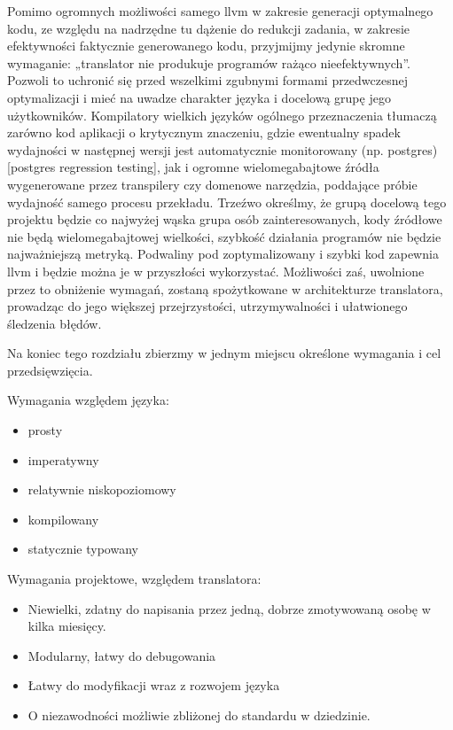 Pomimo ogromnych możliwości samego llvm w zakresie generacji optymalnego kodu, ze względu na nadrzędne tu dążenie do redukcji zadania, w zakresie efektywności faktycznie generowanego kodu, przyjmijmy jedynie skromne wymaganie: „translator nie produkuje programów rażąco nieefektywnych”. Pozwoli to uchronić się przed wszelkimi zgubnymi formami przedwczesnej optymalizacji i mieć na uwadze charakter języka i docelową grupę jego użytkowników. Kompilatory wielkich języków ogólnego przeznaczenia tłumaczą zarówno kod aplikacji o krytycznym znaczeniu, gdzie ewentualny spadek wydajności w następnej wersji jest automatycznie monitorowany (np. postgres)[postgres regression testing], jak i ogromne wielomegabajtowe źródła  wygenerowane przez transpilery czy domenowe narzędzia, poddające próbie wydajność samego procesu przekładu.
Trzeźwo określmy, że grupą docelową tego projektu będzie co najwyżej wąska grupa osób zainteresowanych, kody źródłowe nie będą wielomegabajtowej wielkości, szybkość działania programów nie będzie najważniejszą metryką. Podwaliny pod zoptymalizowany i szybki kod zapewnia llvm i będzie można je w przyszłości wykorzystać. Możliwości zaś, uwolnione przez to obniżenie wymagań, zostaną spożytkowane w architekturze translatora, prowadząc do jego większej przejrzystości, utrzymywalności i ułatwionego śledzenia błędów.

Na koniec tego rozdziału zbierzmy w jednym miejscu określone wymagania i cel przedsięwzięcia.

Wymagania względem języka:
\begin{itemize}[noitemsep]
    \item prosty
    \item imperatywny
    \item relatywnie niskopoziomowy
    \item kompilowany
    \item statycznie typowany
\end{itemize}

Wymagania projektowe, względem translatora:
\begin{itemize}[noitemsep]
    \item Niewielki, zdatny do napisania przez jedną, dobrze zmotywowaną osobę w kilka miesięcy.
    \item Modularny, łatwy do debugowania
    \item Łatwy do modyfikacji wraz z rozwojem języka
    \item O niezawodności możliwie zbliżonej do standardu w dziedzinie.
\end{itemize}

